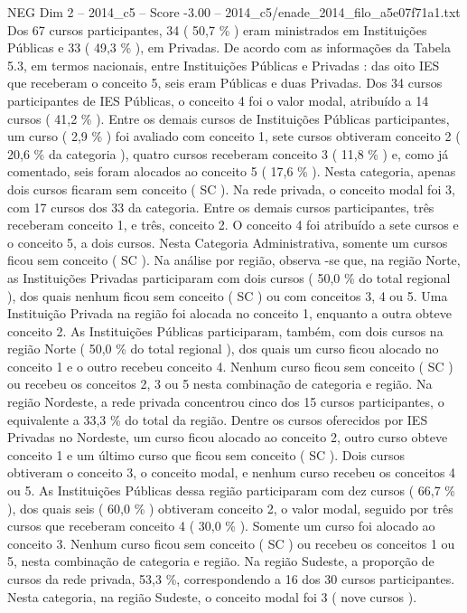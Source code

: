 \begin{textsample}{NEG Dim 2 – 2014\_c5 – Score -3.00 – 2014\_c5/enade\_2014\_filo\_a5e07f71a1.txt}
Dos 67 cursos participantes, 34 ( 50,7 \% ) eram ministrados em Instituições Públicas e 33 ( 49,3 \% ), em Privadas.
De acordo com as informações da Tabela 5.3, em termos nacionais, entre Instituições Públicas e Privadas : das oito IES que receberam o conceito 5, seis eram Públicas e duas Privadas.
Dos 34 cursos participantes de IES Públicas, o conceito 4 foi o valor modal, atribuído a 14 cursos ( 41,2 \% ).
Entre os demais cursos de Instituições Públicas participantes, um curso ( 2,9 \% ) foi avaliado com conceito 1, sete cursos obtiveram conceito 2 ( 20,6 \% da categoria ), quatro cursos receberam conceito 3 ( 11,8 \% ) e, como já comentado, seis foram alocados ao conceito 5 ( 17,6 \% ).
Nesta categoria, apenas dois cursos ficaram sem conceito ( SC ).
Na rede privada, o conceito modal foi 3, com 17 cursos dos 33 da categoria.
Entre os demais cursos participantes, três receberam conceito 1, e três, conceito 2.
O conceito 4 foi atribuído a sete cursos e o conceito 5, a dois cursos.
Nesta Categoria Administrativa, somente um cursos ficou sem conceito ( SC ).
Na análise por região, observa -se que, na região Norte, as Instituições Privadas participaram com dois cursos ( 50,0 \% do total regional ), dos quais nenhum ficou sem conceito ( SC ) ou com conceitos 3, 4 ou 5.
Uma Instituição Privada na região foi alocada no conceito 1, enquanto a outra obteve conceito 2.
As Instituições Públicas participaram, também, com dois cursos na região Norte ( 50,0 \% do total regional ), dos quais um curso ficou alocado no conceito 1 e o outro recebeu conceito 4.
Nenhum curso ficou sem conceito ( SC ) ou recebeu os conceitos 2, 3 ou 5 nesta combinação de categoria e região.
Na região Nordeste, a rede privada concentrou cinco dos 15 cursos participantes, o equivalente a 33,3 \% do total da região.
Dentre os cursos oferecidos por IES Privadas no Nordeste, um curso ficou alocado ao conceito 2, outro curso obteve conceito 1 e um último curso que ficou sem conceito ( SC ).
Dois cursos obtiveram o conceito 3, o conceito modal, e nenhum curso recebeu os conceitos 4 ou 5.
As Instituições Públicas dessa região participaram com dez cursos ( 66,7 \% ), dos quais seis ( 60,0 \% ) obtiveram conceito 2, o valor modal, seguido por três cursos que receberam conceito 4 ( 30,0 \% ).
Somente um curso foi alocado ao conceito 3.
Nenhum curso ficou sem conceito ( SC ) ou recebeu os conceitos 1 ou 5, nesta combinação de categoria e região.
Na região Sudeste, a proporção de cursos da rede privada, 53,3 \%, correspondendo a 16 dos 30 cursos participantes.
Nesta categoria, na região Sudeste, o conceito modal foi 3 ( nove cursos ).

\end{textsample}
